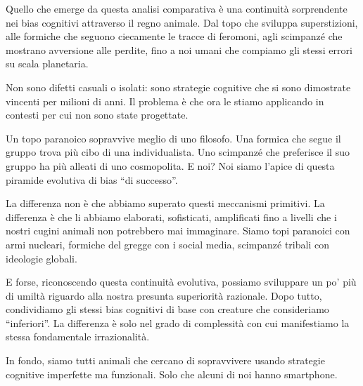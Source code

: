 Quello che emerge da questa analisi comparativa è una continuità sorprendente nei bias cognitivi attraverso il regno animale. Dal topo che sviluppa superstizioni, alle formiche che seguono ciecamente le tracce di feromoni, agli scimpanzé che mostrano avversione alle perdite, fino a noi umani che compiamo gli stessi errori su scala planetaria.

Non sono difetti casuali o isolati: sono strategie cognitive che si sono dimostrate vincenti per milioni di anni. Il problema è che ora le stiamo applicando in contesti per cui non sono state progettate.

Un topo paranoico sopravvive meglio di uno filosofo. Una formica che segue il gruppo trova più cibo di una individualista. Uno scimpanzé che preferisce il suo gruppo ha più alleati di uno cosmopolita. E noi? Noi siamo l'apice di questa piramide evolutiva di bias ``di successo''.

La differenza non è che abbiamo superato questi meccanismi primitivi. La differenza è che li abbiamo elaborati, sofisticati, amplificati fino a livelli che i nostri cugini animali non potrebbero mai immaginare. Siamo topi paranoici con armi nucleari, formiche del gregge con i social media, scimpanzé tribali con ideologie globali.

E forse, riconoscendo questa continuità evolutiva, possiamo sviluppare un po' più di umiltà riguardo alla nostra presunta superiorità razionale. Dopo tutto, condividiamo gli stessi bias cognitivi di base con creature che consideriamo ``inferiori''. La differenza è solo nel grado di complessità con cui manifestiamo la stessa fondamentale irrazionalità.

In fondo, siamo tutti animali che cercano di sopravvivere usando strategie cognitive imperfette ma funzionali. Solo che alcuni di noi hanno smartphone.
